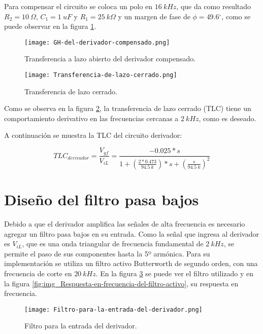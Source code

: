 \noindent Para compensar el circuito se coloca un polo en $16 \:kHz$, que da como resultado $R_2=10\:\Omega$, $C_1=1\:uF$ y $R_1=25\: k\Omega$ y un margen de fase de $\phi =49.6{}^\circ $, como se puede observar en la figura \ref{fig:img_GH del derivador compensado}.

\begin{figure}[H]
	\centering
	\texttt{[image: GH-del-derivador-compensado.png]}
	\caption{Transferencia a lazo abierto del derivador compensado.}
	\label{fig:img_GH del derivador compensado}
\end{figure}

\begin{figure}[H]
	\centering
	\texttt{[image: Transferencia-de-lazo-cerrado.png]}
	\caption{Transferencia de lazo cerrado.}
	\label{fig:img_Transferencia-de-lazo-cerrado}
\end{figure}

\noindent Como se observa en la figura \ref{fig:img_Transferencia-de-lazo-cerrado}, la transferencia de lazo cerrado (TLC) tiene un comportamiento derivativo en las frecuencias cercanas a $2 \:kHz$, como es deseado.

\noindent A continuaci\'{o}n se muestra la TLC del circuito derivador:
 
\begin{equation} \label{eq_TLC_derivador}
	{TLC}_{derivador}=\frac{V_{yf}}{V_{iL}}=\frac{-0.025*s}{1+(\frac{2*0.473}{94.5\: k})*s+(\frac{s}{94.5\:k})^2}
\end{equation} 

\section{Dise\~{n}o del filtro pasa bajos}

\noindent Debido a que el derivador amplifica las se\~{n}ales de alta frecuencia es necesario agregar un filtro pasa bajos en su entrada. Como la se\~{n}al que ingresa al derivador es $V_{iL}$, que es una onda triangular de frecuencia fundamental de $2\:kHz$, se permite el paso de sus componentes hasta la 5º arm\'{o}nica. Para su implementaci\'{o}n se utiliza un filtro activo Butterworth de segundo orden, con una frecuencia de corte en $20\:kHz$. En la figura  \ref{fig:img_Filtro-para-la-entrada-del-derivador} se puede ver el filtro utilizado y en la figura \ref{fig:img_Respuesta-en-frecuencia-del-filtro-activo}, su respuesta en frecuencia.

\begin{figure}[H]
	\centering
	\texttt{[image: Filtro-para-la-entrada-del-derivador.png]}
	\caption{Filtro para la entrada del derivador.}
	\label{fig:img_Filtro-para-la-entrada-del-derivador}
\end{figure}

